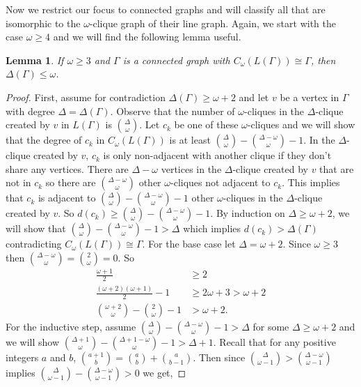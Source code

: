 \documentclass[12pt]{report}
\newtheorem{lem}[thm]{Lemma}
\theoremstyle{definition}
\begin{document}
Now we restrict our focus to connected graphs and will classify all that are isomorphic to the $\omega$-clique graph of their line graph. Again, we start with the case $\omega \geq 4$ and we will find the following lemma useful.
\clearpage
\begin{lem} \label{lem:delta}
    If $\omega\geq 3$ and $\Gamma$ is a connected graph with $C_\omega(L(\Gamma)) \cong \Gamma$, then $\Delta(\Gamma) \leq \omega$.
\end{lem}
\begin{proof}
    First, assume for contradiction $\Delta(\Gamma) \geq \omega +2$ and let $v$ be a vertex in $\Gamma$ with degree $\Delta=\Delta(\Gamma)$. Observe that the number of $\omega$-cliques in the $\Delta$-clique created by $v$ in $L(\Gamma)$ is $\binom{\Delta}{\omega}$. Let $c_k$ be one of these $\omega$-cliques and we will show that the degree of $c_k$ in $C_\omega(L(\Gamma))$ is at least $\binom{\Delta}{\omega}-\binom{\Delta-\omega}{\omega}-1$. In the $\Delta$-clique created by $v$, $c_k$ is only non-adjacent with another clique if they don't share any vertices. There are $\Delta-\omega$ vertices in the $\Delta$-clique created by $v$ that are not in $c_k$ so there are $\binom{\Delta-\omega}{\omega}$ other $\omega$-cliques not adjacent to $c_k$. This implies that $c_k$ is adjacent to $\binom{\Delta}{\omega}-\binom{\Delta-\omega}{\omega}-1$ other $\omega$-cliques in the $\Delta$-clique created by $v$. So $d(c_k) \geq \binom{\Delta}{\omega}-\binom{\Delta-\omega}{\omega}-1$. By induction on $\Delta \geq \omega+2$, we will show that $\binom{\Delta}{\omega}-\binom{\Delta-\omega}{\omega}-1 > \Delta$ which implies $d(c_k) > \Delta(\Gamma)$ contradicting $C_\omega(L(\Gamma)) \cong \Gamma$. For the base case let $\Delta=\omega+2$. Since $\omega \geq 3$ then $\binom{\Delta-\omega}{\omega}=\binom{2}{\omega}=0$. So
    \begin{align*}
        \frac{\omega+1}{2} &\geq 2\\
        \frac{(\omega+2)(\omega+1)}{2} -1 & \geq 2\omega+3 >\omega+2\\
        \binom{\omega+2}{\omega}-\binom{2}{\omega}-1 &>\omega+2.
    \end{align*}
    For the inductive step, assume $\binom{\Delta}{\omega}-\binom{\Delta-\omega}{\omega}-1>\Delta$ for some $\Delta\geq \omega+2$ and we will show $\binom{\Delta+1}{\omega}-\binom{\Delta+1-\omega}{\omega}-1>\Delta+1$. Recall that for any positive integers $a$ and $b$, $\binom{a+1}{b}=\binom{a}{b}+\binom{a}{b-1}$. Then since $\binom{\Delta}{\omega-1} > \binom{\Delta-\omega}{\omega-1}$ implies $\binom{\Delta}{\omega-1} - \binom{\Delta-\omega}{\omega-1} >0$ we get,

\end{proof}
\end{document}
